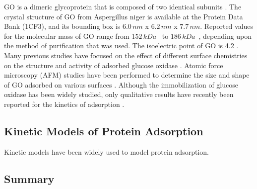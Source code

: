 GO is a dimeric glycoprotein that is composed of two identical subunits
\cite{Wohlfahrt1999}. The crystal structure of GO from Aspergillus
niger is available at the Protein Data Bank (1CF3), and its bounding
box is $6.0\, nm$ x $6.2\, nm$ x $7.7\, nm$. Reported values for
the molecular mass of GO range from $152\, kDa$~\cite{Keilin1948}
to $186\, kDa$~\cite{Swoboda1965}, depending upon the method of
purification that was used. The isoelectric point of GO is 4.2 \cite{Pazur1964}.
Many previous studies have focused on the effect of different surface
chemistries on the structure and activity of adsorbed glucose oxidase
\cite{Fears2009,Dong1997}. Atomic force microscopy (AFM) studies
have been performed to determine the size and shape of GO adsorbed
on various surfaces \cite{Muguruma2006,Otsuka2004}. Although the
immobilization of glucose oxidase has been widely studied, only qualitative
results have recently been reported for the kinetics of adsorption
\cite{Muguruma2006}.


\subsection{Kinetic Models of Protein Adsorption}

Kinetic models have been widely used to model protein adsorption.


\subsection{Summary}

